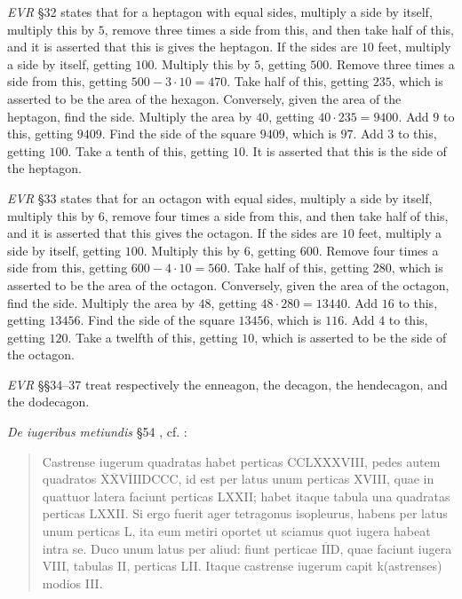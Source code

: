 \documentclass{article}
\theoremstyle{definition}
\begin{document}
{\em EVR} \S 32 \cite[pp.~176--179]{guillaumin} states that for a heptagon with equal sides, multiply a side by
itself, multiply this by $5$, remove three times a side from this, and then take half of this, and it is asserted that
this is gives the heptagon. If the sides are $10$ feet,
multiply a side by itself, getting $100$. Multiply this by $5$, getting $500$. Remove three times a side from this,
getting $500-3\cdot 10=470$. Take half of this, getting $235$, which is asserted to be the area of the hexagon.
Conversely,
given the area of the heptagon, find the side. Multiply the area by $40$, getting $40 \cdot 235 = 9400$.
Add $9$ to this, getting $9409$. Find the side of the square $9409$, which is $97$. Add $3$ to this, getting $100$.
Take a tenth of this, getting $10$. It is asserted that this is the side of the heptagon.

{\em EVR} \S 33 \cite[pp.~178--179]{guillaumin} states that for an octagon with equal sides, 
multiply a side by itself, multiply this by $6$, remove four times a side from this, and then take half of this, and it is asserted that this gives the octagon.
If the sides are $10$ feet, multiply a side by itself, getting $100$. Multiply this by $6$, getting $600$. Remove four times a side from this,
getting $600-4\cdot 10=560$. Take half of this, getting $280$, which is asserted to be the area of the octagon. Conversely,
given the area of the octagon, find the side. Multiply the area by $48$, getting $48 \cdot 280 = 13440$. Add $16$ to this, getting $13456$. Find the side
of the square $13456$, which is $116$. Add $4$ to this, getting $120$. Take a twelfth of this, getting $10$, which is asserted to be the side
of the octagon. 

{\em EVR} \S \S 34--37 \cite[pp.~180--187]{guillaumin} treat respectively the enneagon, the decagon, the hendecagon, and the dodecagon. 

{\em De iugeribus metiundis} \S 54 \cite[pp.~198--201]{guillaumin}, cf.  \cite[p.~354--356]{blumeI}:

\begin{quote}
Castrense iugerum quadratas habet perticas CCLXXXVIII, pedes autem quadratos $\overline{\text{X}} \overline{\text{X}} \overline{\text{VIII}}$DCCC, 
id est per latus unum perticas XVIII, quae in quattuor latera faciunt perticas LXXII; habet itaque tabula una quadratas perticas LXXII. Si ergo
fuerit ager tetragonus isopleurus, habens per latus unum perticas L, ita eum metiri oportet ut sciamus quot iugera habeat intra se. Duco unum latus
per aliud: fiunt perticae $\overline{\text{II}}$D, quae faciunt iugera VIII, tabulas II, perticas LII. Itaque castrense iugerum capit k(astrenses) modios III.
\end{quote}
\end{document}
